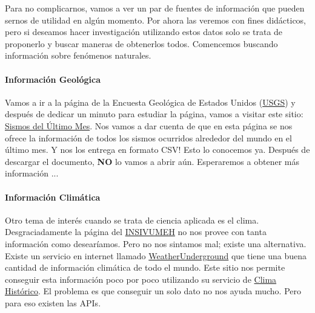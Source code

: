 \documentclass[10pt,letterpaper]{article}
\begin{document}
Para no complicarnos, vamos a ver un par de fuentes de informaci\'on que pueden sernos de utilidad en alg\'un momento. Por ahora las veremos con fines did\'acticos, pero si deseamos hacer investigaci\'on utilizando estos datos solo se trata de proponerlo y buscar maneras de obtenerlos todos. Comencemos buscando informaci\'on sobre fen\'omenos naturales.\\

\paragraph{Informaci\'on Geol\'ogica}
Vamos a ir a la p\'agina de la Encuesta Geol\'ogica de Estados Unidos (\href{https://www.usgs.gov/}{USGS}) y despu\'es de dedicar un minuto para estudiar la p\'agina, vamos a visitar este sitio: \href{https://earthquake.usgs.gov/earthquakes/feed/v1.0/summary/all_month.csv}{Sismos del \'Ultimo Mes}. Nos vamos a dar cuenta de que en esta p\'agina se nos ofrece la informaci\'on de todos los sismos ocurridos alrededor del mundo en el \'ultimo mes. Y nos los entrega en formato CSV! Esto lo conocemos ya. Despu\'es de descargar el documento, \textbf{NO} lo vamos a abrir a\'un. Esperaremos a obtener m\'as informaci\'on ...\\

\paragraph{Informaci\'on Clim\'atica}
Otro tema de inter\'es cuando se trata de ciencia aplicada es el clima. Desgraciadamente la p\'agina del \href{http://www.insivumeh.gob.gt/}{INSIVUMEH} no nos provee con tanta informaci\'on como desear\'iamos. Pero no nos sintamos mal; existe una alternativa. Existe un servicio en internet llamado \href{https://www.wunderground.com/}{WeatherUnderground} que tiene una buena cantidad de informaci\'on clim\'atica de todo el mundo. Este sitio nos permite conseguir esta informaci\'on poco por poco utilizando su servicio de \href{https://www.wunderground.com/history/}{Clima Hist\'orico}. El problema es que conseguir un solo dato no nos ayuda mucho. Pero para eso existen las APIs.\\
\end{document}
